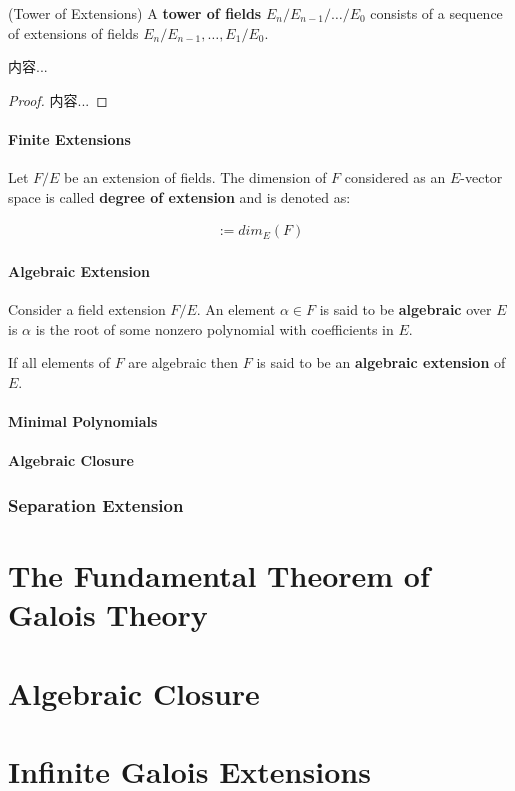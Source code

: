 \documentclass[Total.tex]{subfiles}
\begin{document}
				\begin{Def}
					(Tower of Extensions) A \textbf{tower of fields} $E_n/E_{n-1}/\dots/E_0$ consists of a sequence of extensions of fields $E_n/E_{n-1},\dots,E_1/E_0$.
				\end{Def}
				
				\begin{Def}
					
				\end{Def}
				
				\begin{lemma}
					内容...
				\end{lemma}
				
				\begin{proof}
					内容...
				\end{proof}
			
				\subsubsection{Finite Extensions}
				
				\begin{Def}
					Let $F/E$ be an extension of fields. The dimension of $F$ considered as an $E$-vector space is called \textbf{degree of extension} and is denoted as:
					
					\begin{gather*}
						[E:F]:=dim_E(F)
					\end{gather*}
				\end{Def}
				\subsubsection{Algebraic Extension}
				
					\begin{Def}
						Consider a field extension $F/E$. An element $\alpha\in F$ is said to be \textbf{algebraic} over $E$ is $\alpha$ is the root of some nonzero polynomial with coefficients in $E$.
						
						If all elements of $F$ are algebraic then $F$ is said to be an \textbf{algebraic extension} of $E$.
					\end{Def}
				
				\subsubsection{Minimal Polynomials}
				
				\subsubsection{Algebraic Closure}
			\subsection{Separation Extension}
	
	\chapter{The Fundamental Theorem of Galois Theory}
	
	\chapter{Algebraic Closure}
	
	\chapter{Infinite Galois Extensions}
	
\end{document}
